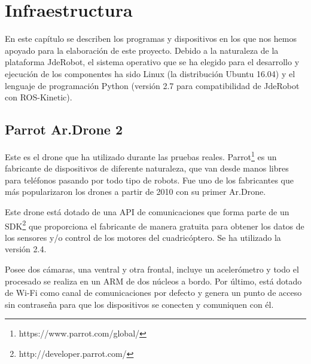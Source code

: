 \chapter{Infraestructura}\label{cap.infraestructura}
En este capítulo se describen los programas y dispositivos en los que nos hemos apoyado para la elaboración de este proyecto.
Debido a la naturaleza de la plataforma JdeRobot, el sistema operativo que se ha elegido para el desarrollo y ejecución de los componentes ha sido Linux (la distribución Ubuntu 16.04) y el lenguaje de programación Python (versión 2.7 para compatibilidad de JdeRobot con ROS-Kinetic).

\section{Parrot Ar.Drone 2}

Este es el drone que ha utilizado durante las pruebas reales. Parrot\footnote{https://www.parrot.com/global/} es un fabricante de dispositivos de diferente naturaleza, que van desde manos libres para teléfonos pasando por todo tipo de robots. Fue uno de los fabricantes que más popularizaron los drones a partir de 2010 con su primer Ar.Drone.

Este drone está dotado de una API de comunicaciones que forma parte de un SDK\footnote{http://developer.parrot.com/} que proporciona el fabricante de manera gratuita para obtener los datos de los sensores y/o control de los motores del cuadricóptero. Se ha utilizado la versión 2.4.

Posee dos cámaras, una ventral y otra frontal, incluye un acelerómetro y todo el procesado se realiza en un ARM de dos núcleos a bordo. Por último, está dotado de Wi-Fi como canal de comunicaciones por defecto y genera un punto de acceso sin contraseña para que los dispositivos se conecten y comuniquen con él. 



